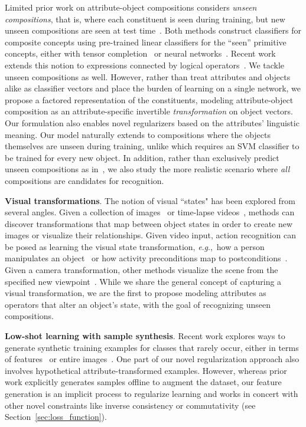 \documentclass[runningheads]{llncs}
\newcommand{\eg}{\textit{e}.\textit{g}.,~}
\newcommand{\refsec}[1]{Section~\ref{#1}}
\begin{document}
Limited prior work on attribute-object compositions considers \emph{unseen compositions}, that is, where each constituent is seen during training, but new unseen compositions are seen at test time~\cite{chen2014inferring,misra2017red}.  Both methods construct classifiers for composite concepts using pre-trained linear classifiers for the ``seen'' primitive concepts, either with tensor completion~\cite{chen2014inferring} or neural networks~\cite{misra2017red}.  Recent work extends this notion to expressions connected by logical operators~\cite{cruz2018neural}.  We tackle unseen compositions as well. However, rather than treat attributes and objects alike as classifier vectors and place the burden of learning on a single network, we propose a factored representation of the constituents, modeling attribute-object composition as an attribute-specific invertible \emph{transformation} on object vectors. Our formulation also enables novel regularizers based on the attributes' linguistic meaning. Our model naturally extends to compositions where the objects themselves are unseen during training, unlike \cite{chen2014inferring,misra2017red} which requires an SVM classifier to be trained for every new object.
In addition, rather than exclusively predict unseen compositions as in~\cite{misra2017red}, we also study the more realistic scenario where \emph{all} compositions are candidates for recognition. 


\vspace{0.05in}
\noindent\textbf{Visual transformations}.
The notion of visual ``states" has been explored from several  angles. 
Given a collection of images~\cite{isola2015discovering} or time-lapse videos~\cite{zhou2016learning,Laffont14}, methods can discover transformations that map between object states in order to create new images or visualize their relationships.  Given video input, action recognition can be posed as learning the visual state transformation, \eg how a person manipulates an object~\cite{fathi2013modeling,alayrac2017joint} or how activity preconditions map to postconditions~\cite{wang2016actions}.  
Given a camera transformation, other methods visualize the scene from the specified new viewpoint~\cite{jayaraman2015learning,zhou2016view}. While we share the general concept of capturing a visual transformation, we are the first to propose modeling attributes as operators that alter an object's state, with the goal of recognizing unseen compositions. 

\vspace{0.05in}
\noindent\textbf{Low-shot learning with sample synthesis}.
Recent work explores ways to generate synthetic training examples for classes that rarely occur, either in terms of features~\cite{dixit2017aga,hariharan2017low,lu2017zero,xian2017feature,zhu2017imagine} or entire images~\cite{yu2017semantic,choe2017face}. One part of our novel regularization approach also involves hypothetical attribute-transformed examples.  However, whereas prior work explicitly generates samples offline to augment the dataset, our feature generation  is an implicit process to regularize learning and works in concert with other novel constraints like inverse consistency or commutativity (see \refsec{sec:loss_function}). \vspace*{-0.1in}
\end{document}
